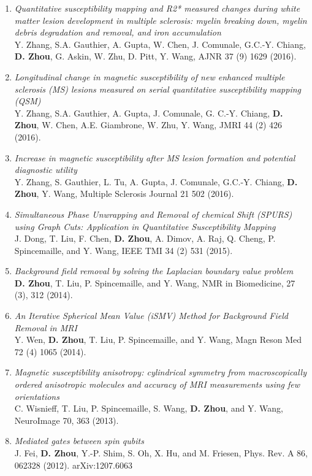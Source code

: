\documentclass[centered,11pt,overlapped]{res}
\begin{document}
\begin{resume}
{\begin{enumerate}[leftmargin=-0.02in]
\item {\em Quantitative susceptibility mapping and R2* measured changes during white matter lesion development in multiple sclerosis: myelin breaking down, myelin debris degradation and removal, and iron accumulation }\\
Y. Zhang, S.A. Gauthier, A. Gupta, W. Chen, J. Comunale, G.C.-Y. Chiang, {\bf D. Zhou}, G. Askin, W. Zhu, D. Pitt, Y. Wang, AJNR 37 (9) 1629 (2016).
\item {\em Longitudinal change in magnetic susceptibility of new enhanced multiple sclerosis (MS) lesions measured on serial quantitative susceptibility mapping (QSM)}\\
Y. Zhang, S.A. Gauthier, A. Gupta, J. Comunale, G. C.-Y. Chiang, {\bf D. Zhou}, W. Chen, A.E. Giambrone, W. Zhu, Y. Wang, JMRI 44 (2) 426 (2016).
\item {\em Increase in magnetic susceptibility after MS lesion formation and potential diagnostic utility} \\
Y. Zhang, S. Gauthier, L. Tu, A. Gupta, J. Comunale, G.C.-Y. Chiang, {\bf D. Zhou}, Y. Wang, Multiple Sclerosis Journal 21 502 (2016).
\item {\em Simultaneous Phase Unwrapping and Removal of chemical Shift (SPURS) using Graph Cuts: Application in Quantitative Susceptibility Mapping}\\
J. Dong, T. Liu, F. Chen, {\bf D. Zhou}, A. Dimov, A. Raj, Q. Cheng, P. Spincemaille, and Y. Wang, IEEE TMI 34 (2) 531 (2015).
\item {\em Background field removal by solving the Laplacian boundary value problem}\\
{\bf D. Zhou}, T. Liu, P. Spincemaille, and Y. Wang, NMR in Biomedicine, 27 (3), 312 (2014).
\item {\em An Iterative Spherical Mean Value (iSMV) Method for Background Field Removal in MRI}\\
Y. Wen, {\bf D. Zhou}, T. Liu, P. Spincemaille, and Y. Wang, Magn Reson Med 72 (4) 1065 (2014).
\item {\em Magnetic susceptibility anisotropy: cylindrical symmetry from macroscopically ordered anisotropic molecules and accuracy of MRI measurements using few orientations}\\
C. Wisnieff, T. Liu, P. Spincemaille, S. Wang, {\bf D. Zhou}, and Y. Wang,  NeuroImage 70, 363 (2013).
\item{\em Mediated gates between spin qubits} \\
J. Fei, {\bf D. Zhou}, Y.-P. Shim, S. Oh, X. Hu, and M. Friesen, Phys. Rev. A 86, 062328 (2012). arXiv:1207.6063

\end{enumerate}}
\end{resume}
\end{document}
